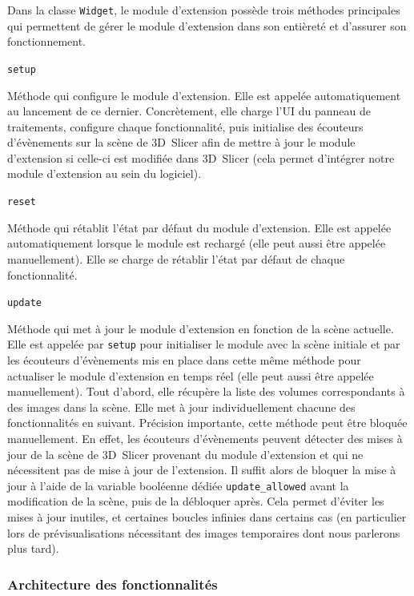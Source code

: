 \documentclass{article}
\newcommand{\method}[1]{\hspace{1in}\texttt{#1}\bigskip}
\begin{document}
{{{            \bigskip

            Dans la classe \texttt{Widget}, le module d'extension possède trois méthodes principales qui permettent de gérer le module d'extension dans son entièreté et d'assurer son fonctionnement.

            \bigskip
            \method{setup}

            Méthode qui configure le module d'extension. Elle est appelée automatiquement au lancement de ce dernier. Concrètement, elle charge l'UI du panneau de traitements, configure chaque fonctionnalité, puis initialise des écouteurs d'évènements sur la scène de 3D~Slicer afin de mettre à jour le module d'extension si celle-ci est modifiée dans 3D~Slicer (cela permet d'intégrer notre module d'extension au sein du logiciel).


            \bigskip
            \method{reset}

            Méthode qui rétablit l'état par défaut du module d'extension. Elle est appelée automatiquement lorsque le module est rechargé (elle peut aussi être appelée manuellement). Elle se charge de rétablir l'état par défaut de chaque fonctionnalité.

            \bigskip
            \method{update}

            Méthode qui met à jour le module d'extension en fonction de la scène actuelle. Elle est appelée par \texttt{setup} pour initialiser le module avec la scène initiale et par les écouteurs d'évènements mis en place dans cette même méthode pour actualiser le module d'extension en temps réel (elle peut aussi être appelée manuellement). Tout d'abord, elle récupère la liste des volumes correspondants à des images dans la scène. Elle met à jour individuellement chacune des fonctionnalités en suivant. Précision importante, cette méthode peut être bloquée manuellement. En effet, les écouteurs d'évènements peuvent détecter des mises à jour de la scène de 3D~Slicer provenant du module d'extension et qui ne nécessitent pas de mise à jour de l'extension. Il suffit alors de bloquer la mise à jour à l'aide de la variable booléenne dédiée \texttt{update\_allowed} avant la modification de la scène, puis de la débloquer après. Cela permet d'éviter les mises à jour inutiles, et certaines boucles infinies dans certains cas (en particulier lors de prévisualisations nécessitant des images temporaires dont nous parlerons plus tard).
        }

        {
            \subsubsection{Architecture des fonctionnalités}
            \label{subsubsec:feature-architecture}

}}}
\end{document}
